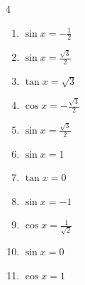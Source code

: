 \begin{multicols}{4}
\begin{enumerate}

  \item $\displaystyle \sin{x}  = -\frac{1}{2}$


\columnbreak %

  \item $\displaystyle \sin{x}  = \frac{\sqrt{3}}{2}$


  \item $\displaystyle \tan{x}  = \sqrt{3}$


  \item $\displaystyle \cos{x}  = -\frac{\sqrt{3}}{2}$


  \item $\displaystyle \sin{x}  = \frac{\sqrt{3}}{2}$


  \item $\displaystyle \sin{x}  = 1$


  \item $\displaystyle \tan{x}  = 0$


  \item $\displaystyle \sin{x}  = -1$


  \item $\displaystyle \cos{x}  = \frac{1}{\sqrt{2}}$


  \item $\displaystyle \sin{x}  = 0$


  \item $\displaystyle \cos{x}  = 1$



\end{enumerate}
\end{multicols}
